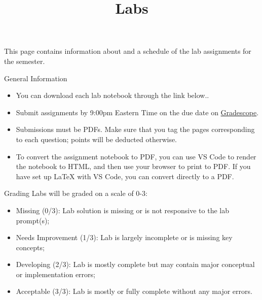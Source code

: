 \documentclass[
  ignorenonframetext,
  aspectratio=169,
]{beamer}
\title{\texorpdfstring{Labs}{Labs}}
\author{}
\date{}
\providecommand{\tightlist}{%
  \setlength{\itemsep}{0pt}\setlength{\parskip}{0pt}}
\begin{document}
\frame{\titlepage}


\begin{frame}
This page contains information about and a schedule of the lab
assignments for the semester.
\end{frame}

\begin{frame}{General Information}
\protect{}\label{general-information}
\begin{itemize}
\tightlist
\item
  You can download each lab notebook through the link below..
\item
  Submit assignments by 9:00pm Eastern Time on the due date on
  \href{https://gradescope.com}{Gradescope}.
\item
  Submissions must be PDFs. Make sure that you tag the pages
  corresponding to each question; points will be deducted otherwise.
\item
  To convert the assignment notebook to PDF, you can use VS Code to
  render the notebook to HTML, and then use your browser to print to
  PDF. If you have set up LaTeX with VS Code, you can convert directly
  to a PDF.
\end{itemize}
\end{frame}

\begin{frame}{Grading}
\protect{}\label{grading}
Labs will be graded on a scale of 0-3:

\begin{itemize}
\tightlist
\item
  Missing (0/3): Lab solution is missing or is not responsive to the lab
  prompt(s);
\item
  Needs Improvement (1/3): Lab is largely incomplete or is missing key
  concepts;
\item
  Developing (2/3): Lab is mostly complete but may contain major
  conceptual or implementation errors;
\item
  Acceptable (3/3): Lab is mostly or fully complete without any major
  errors.
\end{itemize}
\end{frame}
\end{document}
